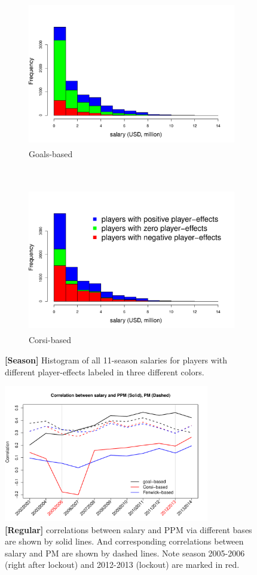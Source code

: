 \begin{figure}[htb!]
	\centering
	\begin{subfigure}[t]{0.5\textwidth}
		\centering
		\includegraphics[height=2.5in]{figures/salaryhist-goals-season.pdf}
		\caption{Goals-based}
	\end{subfigure}%
	~ 
	\begin{subfigure}[t]{0.5\textwidth}
		\centering
		\includegraphics[height=2.5in]{figures/salaryhist-corsi-season.pdf}
		\caption{Corsi-based}
	\end{subfigure}
	\caption{\textbf{[Season]} Histogram of all 11-season salaries for players with different player-effects labeled in three different colors.}
\end{figure}

\begin{figure}[htb!]
	\centering
	\includegraphics[width=0.8\textwidth]{figures/ppmpmsal-corr-regular.pdf}
	\caption{\textbf{[Regular]} correlations between salary and PPM via different bases are shown by solid lines. And corresponding correlations between salary and PM are shown by dashed lines. Note season 2005-2006 (right after lockout) and 2012-2013 (lockout) are marked in red. }\label{fig:ppmpmsal-corr-regular}
\end{figure}

